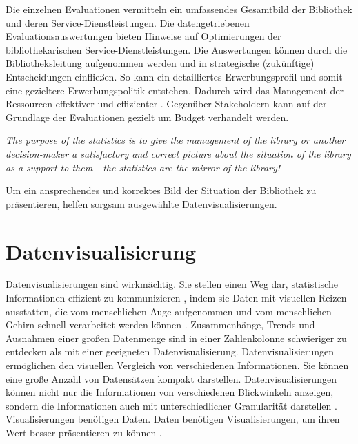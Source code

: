 Die einzelnen Evaluationen vermitteln ein umfassendes Gesamtbild der Bibliothek und deren Service-Dienstleistungen. 
Die datengetriebenen Evaluationsauswertungen bieten Hinweise auf Optimierungen der bibliothekarischen Service-Dienstleistungen. 
Die Auswertungen können durch die Bibliotheksleitung aufgenommen werden und in strategische (zukünftige) Entscheidungen einfließen. 
So kann ein detailliertes Erwerbungsprofil und somit eine gezieltere Erwerbungspolitik entstehen. 
Dadurch wird das Management der Ressourcen effektiver und effizienter \cite[vgl.][297]{johnson_peggy_fundamentals_2014}.
Gegenüber Stakeholdern kann auf der Grundlage der Evaluationen gezielt um Budget verhandelt werden.
\begin{displayquote}
    \textit{The purpose of the statistics is to give the management of the library or another decision-maker 
    a satisfactory and correct picture about the situation of the library as a support to them - the statistics are the mirror of the library!}
    \cite[463]{laitinen_markku_library_2013}
\end{displayquote}

Um ein ansprechendes und korrektes Bild der Situation der Bibliothek zu präsentieren, helfen sorgsam ausgewählte Datenvisualisierungen.



\clearpage

\section{Datenvisualisierung}
\label{chap:two_two}
Datenvisualisierungen sind wirkmächtig. Sie stellen einen Weg dar, statistische Informationen effizient zu kommunizieren \cite[vgl.][15]{Tufte01}, 
indem sie Daten mit visuellen Reizen ausstatten, die vom menschlichen Auge aufgenommen und vom menschlichen Gehirn schnell verarbeitet werden können \cite[vgl.][32]{few_now_2009}. 
Zusammenhänge, Trends und Ausnahmen einer großen Datenmenge sind in einer Zahlenkolonne schwieriger zu entdecken als mit einer geeigneten Datenvisualisierung.
Datenvisualisierungen ermöglichen den visuellen Vergleich von verschiedenen Informationen. Sie können eine große Anzahl von Datensätzen kompakt darstellen. 
Datenvisualisierungen können nicht nur die Informationen von verschiedenen Blickwinkeln anzeigen, sondern die Informationen auch
mit unterschiedlicher Granularität darstellen \cite[vgl.][245]{muller_business_2013}.
Visualisierungen benötigen Daten. Daten benötigen Visualisierungen, um ihren Wert besser präsentieren zu können \cite[vgl.][16]{kirk_data_2019}.



